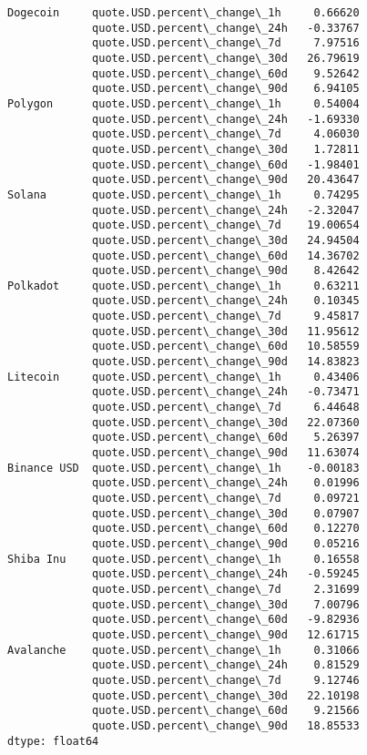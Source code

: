 \documentclass[11pt]{article}
\begin{document}
\begin{tcolorbox}[breakable, size=fbox, boxrule=.5pt, pad at break*=1mm, opacityfill=0]
\begin{Verbatim}[commandchars=\\\{\}]
Dogecoin     quote.USD.percent\_change\_1h     0.66620
             quote.USD.percent\_change\_24h   -0.33767
             quote.USD.percent\_change\_7d     7.97516
             quote.USD.percent\_change\_30d   26.79619
             quote.USD.percent\_change\_60d    9.52642
             quote.USD.percent\_change\_90d    6.94105
Polygon      quote.USD.percent\_change\_1h     0.54004
             quote.USD.percent\_change\_24h   -1.69330
             quote.USD.percent\_change\_7d     4.06030
             quote.USD.percent\_change\_30d    1.72811
             quote.USD.percent\_change\_60d   -1.98401
             quote.USD.percent\_change\_90d   20.43647
Solana       quote.USD.percent\_change\_1h     0.74295
             quote.USD.percent\_change\_24h   -2.32047
             quote.USD.percent\_change\_7d    19.00654
             quote.USD.percent\_change\_30d   24.94504
             quote.USD.percent\_change\_60d   14.36702
             quote.USD.percent\_change\_90d    8.42642
Polkadot     quote.USD.percent\_change\_1h     0.63211
             quote.USD.percent\_change\_24h    0.10345
             quote.USD.percent\_change\_7d     9.45817
             quote.USD.percent\_change\_30d   11.95612
             quote.USD.percent\_change\_60d   10.58559
             quote.USD.percent\_change\_90d   14.83823
Litecoin     quote.USD.percent\_change\_1h     0.43406
             quote.USD.percent\_change\_24h   -0.73471
             quote.USD.percent\_change\_7d     6.44648
             quote.USD.percent\_change\_30d   22.07360
             quote.USD.percent\_change\_60d    5.26397
             quote.USD.percent\_change\_90d   11.63074
Binance USD  quote.USD.percent\_change\_1h    -0.00183
             quote.USD.percent\_change\_24h    0.01996
             quote.USD.percent\_change\_7d     0.09721
             quote.USD.percent\_change\_30d    0.07907
             quote.USD.percent\_change\_60d    0.12270
             quote.USD.percent\_change\_90d    0.05216
Shiba Inu    quote.USD.percent\_change\_1h     0.16558
             quote.USD.percent\_change\_24h   -0.59245
             quote.USD.percent\_change\_7d     2.31699
             quote.USD.percent\_change\_30d    7.00796
             quote.USD.percent\_change\_60d   -9.82936
             quote.USD.percent\_change\_90d   12.61715
Avalanche    quote.USD.percent\_change\_1h     0.31066
             quote.USD.percent\_change\_24h    0.81529
             quote.USD.percent\_change\_7d     9.12746
             quote.USD.percent\_change\_30d   22.10198
             quote.USD.percent\_change\_60d    9.21566
             quote.USD.percent\_change\_90d   18.85533
dtype: float64
\end{Verbatim}
\end{tcolorbox}
        
\end{document}
